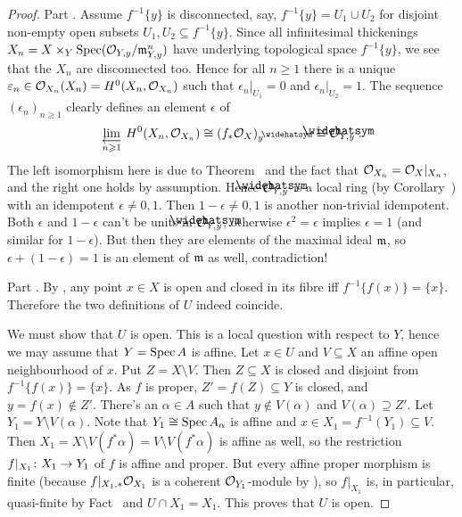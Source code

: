 \documentclass[a4paper,parskip=half,numbers=enddot, DIV=12]{scrreprt}
\renewcommand{\geq}{\geqslant}
\begin{document}
\begin{proof}
	Part . Assume $f^{-1}\{y\}$ is disconnected, say, $f^{-1}\{y\}=U_1\cup U_2$ for disjoint non-empty open subsets $U_1,U_2\subseteq f^{-1}\{y\}$. Since all infinitesimal thickenings $X_n=X\times_Y\operatorname{Spec}(\mathcal{O}_{Y,y}/\mathfrak{m}_{Y,y}^n)$ have underlying topological space $f^{-1}\{y\}$, we see that the $X_n$ are disconnected too. Hence for all $n\geq 1$ there is a unique $\varepsilon_n\in\mathcal{O}_{X_n}(X_n)=H^0(X_n,\mathcal{O}_{X_n})$ such that $\epsilon_n|_{U_1}=0$ and $\epsilon_n|_{U_2}=1$. The sequence $(\epsilon_n)_{n\geq 1}$ clearly defines an element $\epsilon$ of
	\begin{align*}
		\limit[n\geq 1]H^0(X_n,\Oo_{X_n})\cong (f_*\Oo_X)_y^\complete\cong \roof{\Oo}_{Y,y}\;.
	\end{align*}
	The left isomorphism here is due to Theorem~ and the fact that $\mathcal{O}_{X_n}=\mathcal{O}_X|_{X_n}$, and the right one holds by assumption. Hence $\roof{\Oo}_{Y,y}$ is a local ring (by Corollary~) with an idempotent $\epsilon\neq 0,1$. Then $1-\epsilon\neq 0,1$ is another non-trivial idempotent. Both $\epsilon$ and $1-\epsilon$ can't be units in $\roof{\Oo}_{Y,y}$, otherwise $\epsilon^2=\epsilon$ implies $\epsilon=1$ (and similar for $1-\epsilon$). But then they are elements of the maximal ideal $\mathfrak{m}$, so $\epsilon+(1-\epsilon)=1$ is an element of $\mathfrak{m}$ as well, contradiction!
	
	Part . By , any point $x\in X$ is open and closed in its fibre iff $f^{-1}\{f(x)\}=\{x\}$. Therefore the two definitions of $U$ indeed coincide. 
	
	We must show that $U$ is open. This is a local question with respect to $Y$, hence we may assume that $Y=\operatorname{Spec} A$ is affine. Let $x\in U$ and $V\subseteq X$ an affine open neighbourhood of $x$. Put $Z=X\setminus V$. Then $Z\subseteq X$ is closed and disjoint from $f^{-1}\{f(x)\}=\{x\}$. As $f$ is proper, $Z'=f(Z)\subseteq Y$ is closed, and $y=f(x)\notin Z'$. There's an $\alpha\in A$ such that $y\notin V(\alpha)$ and $V(\alpha)\supseteq Z'$. Let $Y_1=Y\setminus V(\alpha)$. Note that $Y_1\cong \operatorname{Spec} A_\alpha$ is affine and $x\in X_1=f^{-1}(Y_1)\subseteq V$. Then $X_1=X\setminus V(f^*\alpha)=V\setminus V(f^*\alpha)$ is affine as well, so the restriction $f|_{X_1}\colon X_1\morphism Y_1$ of $f$ is affine and proper. But every affine proper morphism is finite (because $f|_{X_1,*}\mathcal{O}_{X_1}$ is a coherent $\mathcal{O}_{Y_1}$-module by \cite[Theorem~5]{alggeo2}), so $f|_{X_1}$ is, in particular, quasi-finite by Fact~ and $U\cap X_1=X_1$. This proves that $U$ is open.
\end{proof}
\end{document}
